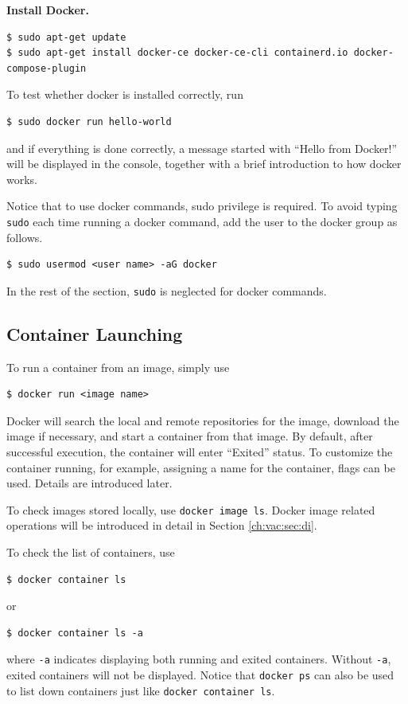 \vspace{0.1in}
\noindent \textbf{Install Docker.}
\begin{lstlisting}
$ sudo apt-get update
$ sudo apt-get install docker-ce docker-ce-cli containerd.io docker-compose-plugin
\end{lstlisting}

To test whether docker is installed correctly, run
\begin{lstlisting}
$ sudo docker run hello-world
\end{lstlisting}
and if everything is done correctly, a message started with ``Hello from Docker!'' will be displayed in the console, together with a brief introduction to how docker works.

Notice that to use docker commands, sudo privilege is required. To avoid typing \verb|sudo| each time running a docker command, add the user to the docker group as follows.
\begin{lstlisting}
$ sudo usermod <user name> -aG docker
\end{lstlisting}

In the rest of the section, \verb|sudo| is neglected for docker commands.

\subsection{Container Launching}

To run a container from an image, simply use
\begin{lstlisting}
$ docker run <image name>
\end{lstlisting}
Docker will search the local and remote repositories for the image, download the image if necessary, and start a container from that image. By default, after successful execution, the container will enter ``Exited'' status. To customize the container running, for example, assigning a name for the container, flags can be used. Details are introduced later.

To check images stored locally, use \verb|docker image ls|. Docker image related operations will be introduced in detail in Section \ref{ch:vac:sec:di}.

To check the list of containers, use
\begin{lstlisting}
$ docker container ls
\end{lstlisting}
or
\begin{lstlisting}
$ docker container ls -a
\end{lstlisting}
where \verb|-a| indicates displaying both running and exited containers. Without \verb|-a|, exited containers will not be displayed. Notice that \verb|docker ps| can also be used to list down containers just like \verb|docker container ls|.

